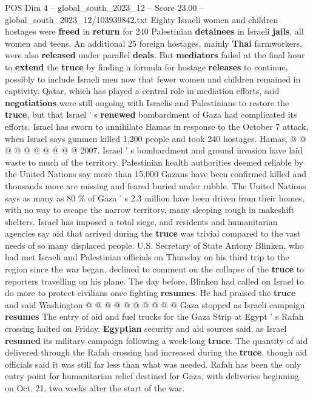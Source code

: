 \begin{textsample}{POS Dim 4 – global\_south\_2023\_12 – Score 23.00 – global\_south\_2023\_12/103939842.txt}
Eighty Israeli women and children hostages were \textbf{freed} in \textbf{return} for 240 Palestinian \textbf{detainees} in Israeli \textbf{jails}, all women and teens.
An additional 25 foreign hostages, mainly \textbf{Thai} farmworkers, were also \textbf{released} under parallel \textbf{deals}.
But \textbf{mediators} failed at the final hour to \textbf{extend} the \textbf{truce} by finding a formula for hostage \textbf{releases} to continue, possibly to include Israeli men now that fewer women and children remained in captivity.
Qatar, which has played a central role in mediation efforts, said \textbf{negotiations} were still ongoing with Israelis and Palestinians to restore the \textbf{truce}, but that Israel ' s \textbf{renewed} bombardment of Gaza had complicated its efforts.
Israel has sworn to annihilate Hamas in response to the October 7 attack, when Israel says gunmen killed 1,200 people and took 240 hostages.
Hamas, @ @ @ @ @ @ @ @ @ @ 2007.
Israel ' s bombardment and ground invasion have laid waste to much of the territory.
Palestinian health authorities deemed reliable by the United Nations say more than 15,000 Gazans have been confirmed killed and thousands more are missing and feared buried under rubble.
The United Nations says as many as 80 \% of Gaza ' s 2.3 million have been driven from their homes, with no way to escape the narrow territory, many sleeping rough in makeshift shelters.
Israel has imposed a total siege, and residents and humanitarian agencies say aid that arrived during the \textbf{truce} was trivial compared to the vast needs of so many displaced people.
U.S.
Secretary of State Antony Blinken, who had met Israeli and Palestinian officials on Thursday on his third trip to the region since the war began, declined to comment on the collapse of the \textbf{truce} to reporters travelling on his plane.
The day before, Blinken had called on Israel to do more to protect civilians once fighting \textbf{resumes}.
He had praised the \textbf{truce} and said Washington @ @ @ @ @ @ @ @ @ @ Gaza stopped as Israeli campaign \textbf{resumes} The entry of aid and fuel trucks for the Gaza Strip at Egypt ' s Rafah crossing halted on Friday, \textbf{Egyptian} security and aid sources said, as Israel \textbf{resumed} its military campaign following a week-long \textbf{truce}.
The quantity of aid delivered through the Rafah crossing had increased during the \textbf{truce}, though aid officials said it was still far less than what was needed.
Rafah has been the only entry point for humanitarian relief destined for Gaza, with deliveries beginning on Oct. 21, two weeks after the start of the war.

\end{textsample}
